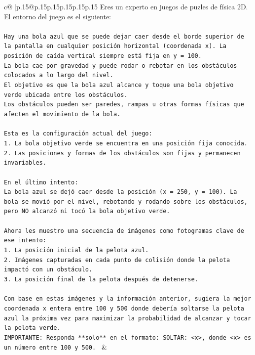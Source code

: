 \documentclass{article}
\begin{document}
{\begin{supertabular}{c@{$\;$}|p{.15\linewidth}@{}p{.15\linewidth}p{.15\linewidth}p{.15\linewidth}p{.15\linewidth}p{.15\linewidth}}
{{{	 Eres un experto en juegos de puzles de física 2D. El entorno del juego es el siguiente:\\ \tt \\ \tt Hay una bola azul que se puede dejar caer desde el borde superior de la pantalla en cualquier posición horizontal (coordenada x). La posición de caída vertical siempre está fija en y = 100.\\ \tt La bola cae por gravedad y puede rodar o rebotar en los obstáculos colocados a lo largo del nivel.\\ \tt El objetivo es que la bola azul alcance y toque una bola objetivo verde ubicada entre los obstáculos.\\ \tt Los obstáculos pueden ser paredes, rampas u otras formas físicas que afecten el movimiento de la bola.\\ \tt \\ \tt Esta es la configuración actual del juego:\\ \tt 1. La bola objetivo verde se encuentra en una posición fija conocida.\\ \tt 2. Las posiciones y formas de los obstáculos son fijas y permanecen invariables.\\ \tt \\ \tt En el último intento:\\ \tt La bola azul se dejó caer desde la posición (x = 250, y = 100). La bola se movió por el nivel, rebotando y rodando sobre los obstáculos, pero NO alcanzó ni tocó la bola objetivo verde.\\ \tt \\ \tt Ahora les muestro una secuencia de imágenes como fotogramas clave de ese intento:\\ \tt 1. La posición inicial de la pelota azul.\\ \tt 2. Imágenes capturadas en cada punto de colisión donde la pelota impactó con un obstáculo.\\ \tt 3. La posición final de la pelota después de detenerse.\\ \tt \\ \tt Con base en estas imágenes y la información anterior, sugiera la mejor coordenada x entera entre 100 y 500 donde debería soltarse la pelota azul la próxima vez para maximizar la probabilidad de alcanzar y tocar la pelota verde.\\ \tt IMPORTANTE: Responda **solo** en el formato: SOLTAR: <x>, donde <x> es un número entre 100 y 500. 
	  } 
	   } 
	   } 
	 & \\ 
 


\end{supertabular}}
\end{document}
